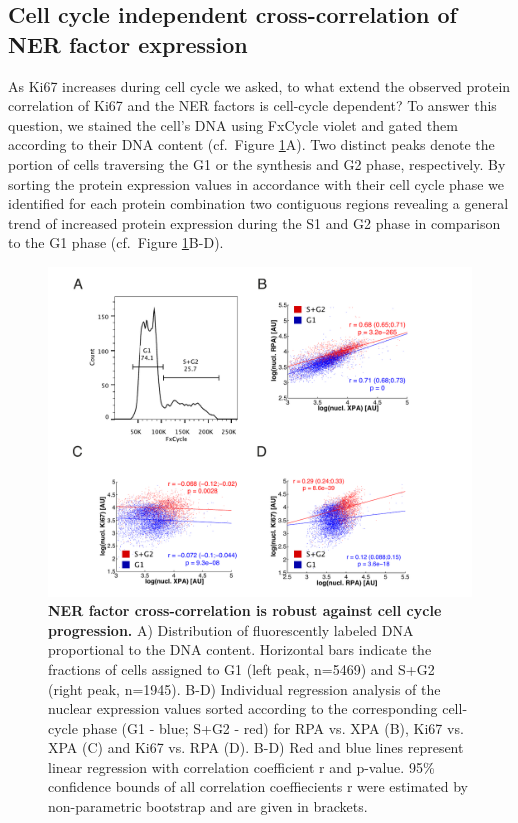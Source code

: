 \subsection {Cell cycle independent cross-correlation of NER factor expression}
As Ki67 increases during cell cycle we asked, to what extend the observed protein correlation of Ki67 and the NER factors is cell-cycle dependent? To answer this question, we stained the cell's DNA using FxCycle violet and gated them according to their DNA content (cf.\ Figure \ref{fig:FC_cell_cycle}A). Two distinct peaks denote the portion of cells traversing the G1 or the synthesis and G2 phase, respectively. By sorting the protein expression values in accordance with their cell cycle phase we identified for each protein combination two contiguous regions revealing a general trend of increased protein expression during the S1 and G2 phase in comparison to the G1 phase (cf.\ Figure \ref{fig:FC_cell_cycle}B-D).  

\begin{figure}[htbp]
	\begin{center}
		\includegraphics[width=1\textwidth]{Abbildungen/figureTAC_4.pdf}
		\caption{\textbf{NER factor cross-correlation is robust against cell cycle progression.} A) Distribution of fluorescently labeled DNA proportional to the DNA content. Horizontal bars indicate the fractions of cells assigned to G1 (left peak, n=5469) and S+G2 (right peak, n=1945).  B-D) Individual regression analysis of the nuclear expression values sorted according to the corresponding cell-cycle phase (G1 - blue; S+G2 - red) for RPA vs. XPA (B), Ki67 vs. XPA (C) and Ki67 vs. RPA (D). B-D) Red and blue lines represent linear regression with correlation coefficient r and p-value. 95\% confidence bounds of all correlation coeffiecients r were estimated by non-parametric bootstrap and are given in brackets.}
		\label{fig:FC_cell_cycle}
	\end{center}
\end{figure}


